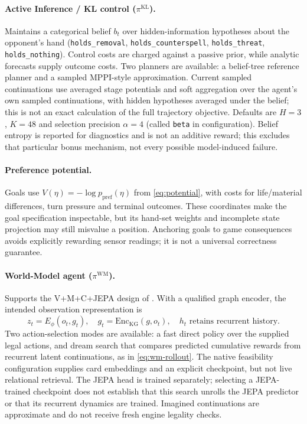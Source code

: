 \documentclass[11pt,a4paper]{article}
\theoremstyle{definition}
\theoremstyle{plain}
\begin{document}
\paragraph{Active Inference / KL control ($\pi^{\mathrm{KL}}$).} Maintains a categorical belief $b_t$ over hidden-information hypotheses about the opponent's hand (\texttt{holds\_removal}, \texttt{holds\_counterspell}, \texttt{holds\_threat}, \texttt{holds\_nothing}). Control costs are charged against a passive prior, while analytic forecasts supply outcome costs. Two planners are available: a belief-tree reference planner and a sampled MPPI-style approximation. Current sampled continuations use averaged stage potentials and soft aggregation over the agent's own sampled continuations, with hidden hypotheses averaged under the belief; this is not an exact calculation of the full trajectory objective. Defaults are $H=3$, $K=48$ and selection precision $\alpha=4$ (called \texttt{beta} in configuration). Belief entropy is reported for diagnostics and is not an additive reward; this excludes that particular bonus mechanism, not every possible model-induced failure.

\paragraph{Preference potential.} Goals use $V(\eta)=-\log p_{\mathrm{pref}}(\eta)$ from \eqref{eq:potential}, with costs for life/material differences, turn pressure and terminal outcomes. These coordinates make the goal specification inspectable, but its hand-set weights and incomplete state projection may still misvalue a position. Anchoring goals to game consequences avoids explicitly rewarding sensor readings; it is not a universal correctness guarantee.

\paragraph{World-Model agent ($\pi^{\mathrm{WM}}$).} Supports the V+M+C+JEPA design of . With a qualified graph encoder, the intended observation representation is
\begin{equation*}
z_t = E_\phi(o_t,g_t),\quad
g_t = \mathrm{Enc}_{\mathrm{KG}}(g,o_t),\quad
h_t\text{ retains recurrent history}.
\end{equation*}
Two action-selection modes are available: a fast direct policy over the supplied legal actions, and dream search that compares predicted cumulative rewards from recurrent latent continuations, as in \eqref{eq:wm-rollout}. The native feasibility configuration supplies card embeddings and an explicit checkpoint, but not live relational retrieval. The JEPA head is trained separately; selecting a JEPA-trained checkpoint does not establish that this search unrolls the JEPA predictor or that its recurrent dynamics are trained. Imagined continuations are approximate and do not receive fresh engine legality checks.
\end{document}
